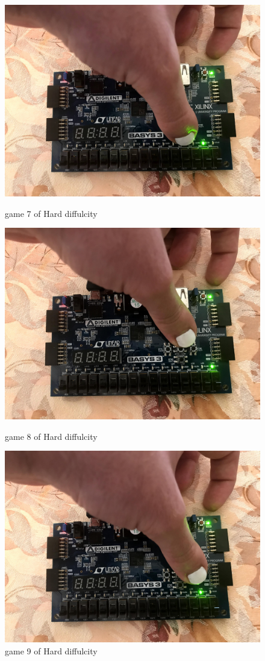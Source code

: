 \documentclass[11pt]{article}
\begin{document}
\begin{figure}[ht]
	\includegraphics{IMG_1307.JPG}
	\caption{game 7 of Hard diffulcity }
	\label{fig:sim_with_table}
	
	\includegraphics{IMG_1308.JPG}
	\caption{game 8 of Hard diffulcity }
	\label{fig:sim_with_table}
	
	\includegraphics{IMG_1309.JPG}
	\caption{game 9 of Hard diffulcity }
	\label{fig:sim_with_table}
	

\end{figure}
\end{document}
